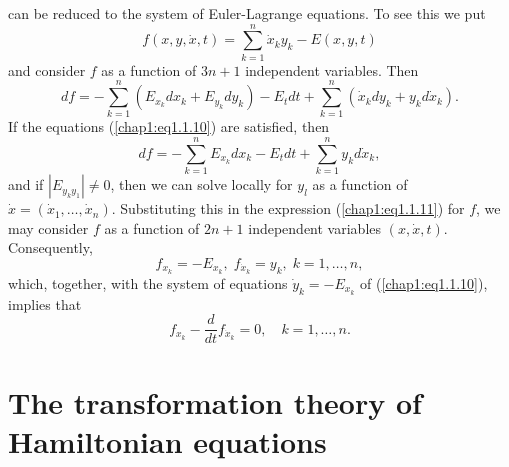 can be reduced to the system of Euler-Lagrange equations. To see this we put 
\begin{equation*}
f(x, y, \dot{x},t) = \sum\limits^n_{k=1} \dot{x}_k y_k - E(x,y,t)\tag{1.1.11}\label{chap1:eq1.1.11}
\end{equation*}
and consider $f$ as a function of $3n+1$ independent variables. Then 
$$
df = - \sum\limits^n_{k=1} (E_{x_k} dx_k + E_{y_k} dy_k) - E_t dt + \sum\limits^n_{k=1} (\dot{x}_k dy_k + y_k d\dot{x}_k).
$$\pageoriginale
If the equations (\ref{chap1:eq1.1.10}) are satisfied, then
$$
df = - \sum\limits^n_{k=1} E_{x_k} dx_k - E_t dt + \sum\limits^n_{k=1} y_k d\dot{x}_k,
$$
and if $|E_{y_k y_1}| \neq 0$, then we can solve locally for $y_l$ as a function of $\dot{x} = (\dot{x}_1, \ldots, \dot{x}_n)$. Substituting this in the expression (\ref{chap1:eq1.1.11}) for $f$, we may consider $f$ as a function of $2n+1$ independent variables $(x, \dot{x},t)$. Consequently,
$$
f_{x_k} = - E_{x_k}, \; f_{\dot{x}_k} = y_k, \; k = 1, \ldots, n,
$$
which, together, with the system of equations $\dot{y}_k = - E_{x_k}$ of (\ref{chap1:eq1.1.10}), implies that 
$$
f_{x_k} - \frac{d}{dt} f_{\dot{x}_k} = 0, \quad k = 1, \ldots, n.
$$

\section{The transformation theory of Hamiltonian equations}\label{chap1:sec2}

